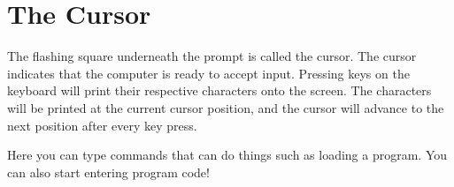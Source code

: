 \section{The Cursor}

The flashing square underneath the  prompt is called the cursor. The cursor indicates that the computer is ready to accept input. Pressing keys on the keyboard will print their respective characters onto the screen. The characters will be printed at the current cursor position, and the cursor will advance to the next position after every key press.

Here you can type commands that can do things such as loading a program. You can also start entering program code!
